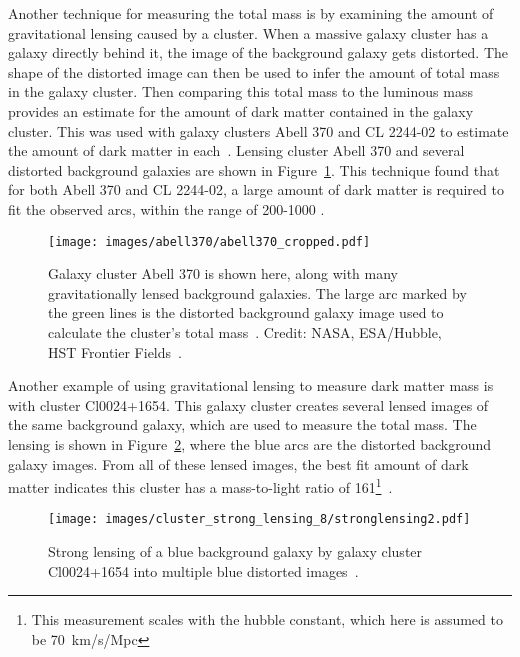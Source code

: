 Another technique for measuring the total mass is by examining the amount of gravitational lensing caused by a cluster.
When a massive galaxy cluster has a galaxy directly behind it, the image of the background galaxy gets distorted.
The shape of the distorted image can then be used to infer the amount of total mass in the galaxy cluster.
Then comparing this total mass to the luminous mass provides an estimate for the amount of dark matter contained in the galaxy cluster.
This was used with galaxy clusters Abell 370 and CL 2244-02 to estimate the amount of dark matter in each~\cite{cluster_lensing}.
Lensing cluster Abell 370 and several distorted background galaxies are shown in Figure~\ref{fig:abell370}.
This technique found that for both Abell 370 and CL 2244-02, a large amount of dark matter is required to fit the observed arcs, within the range of 200-1000 \MLsol.
    
\begin{figure}
  \centering
  \texttt{[image: images/abell370/abell370\_cropped.pdf]}
  \caption[Gravitational Lensing in Abell 370]{
    Galaxy cluster Abell 370 is shown here, along with many gravitationally lensed background galaxies.
    The large arc marked by the green lines is the distorted background galaxy image used to calculate the cluster's total mass~\cite{cluster_lensing}.
    Credit: NASA, ESA/Hubble, HST Frontier Fields~\cite{abell370_hubble}.
  }
  \label{fig:abell370}
\end{figure}
    
Another example of using gravitational lensing to measure dark matter mass is with cluster Cl0024+1654.
This galaxy cluster creates several lensed images of the same background galaxy, which are used to measure the total mass.
The lensing is shown in Figure~\ref{fig:stronglens}, where the blue arcs are the distorted background galaxy images.
From all of these lensed images, the best fit amount of dark matter indicates this cluster has a mass-to-light ratio of \SI{161}{}\MLsol{}\footnote[3]{This measurement scales with the hubble constant, which here is assumed to be \SI{70}{km/s/Mpc}}~\cite{cluster_strong_lensing_1996, cluster_strong_lensing_1998, cluster_strong_lensing_2010}.
    
\begin{figure}
  \centering
  \texttt{[image: images/cluster\_strong\_lensing\_8/stronglensing2.pdf]}
  \caption[Gravitational Lensing in Cl0024+1654]{
    Strong lensing of a blue background galaxy by galaxy cluster Cl0024+1654 into multiple blue distorted images~\cite{cluster_strong_lensing_1996}.
  }
  \label{fig:stronglens}
\end{figure}
    
